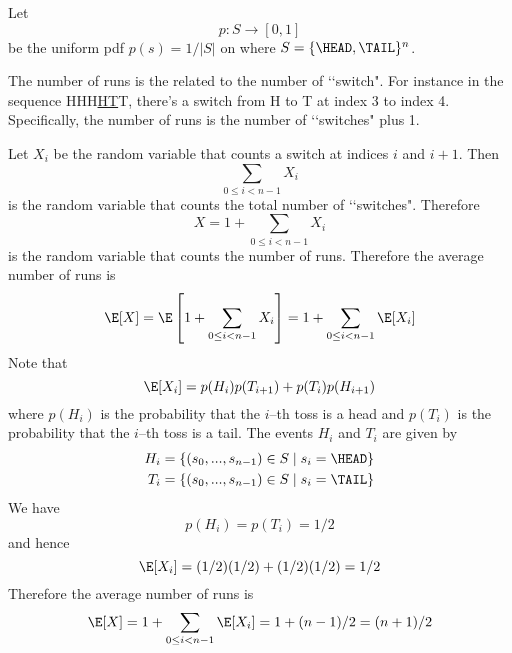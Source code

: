
Let
\[
  p : S \rightarrow [0,1]
\]
be the uniform pdf $p(s) = 1/|S|$ on
where $S = \{ \HEAD, \TAIL \}^n$.

The number of runs is the related to the number of \lq\lq switch".
For instance in the sequence HHH\underline{HT}T, there's a switch
from H to T at index 3 to index 4.
Specifically, the number of runs is the number of \lq\lq switches" plus 1.

Let $X_i$ be the random variable that counts a switch at indices $i$ and $i + 1$.
Then
\[
  \sum_{0 \leq i < n - 1} X_i
\]
is the random variable that counts the total number of \lq\lq switches".
Therefore
\[
  X = 1 + \sum_{0 \leq i < n - 1} X_i
\]
is the random variable that counts the number of runs.
Therefore the average number of runs is
\[
  \E[X] = \E \left[ 1 + \sum_{0 \leq i < n - 1} X_i \right] = 1 + \sum_{0 \leq i < n - 1} \E[X_i]
\]
Note that
\[
\E[X_i] = p(H_i)p(T_{i+1}) + p(T_i)p(H_{i+1}) 
\]
where
$p(H_i)$ is the probability that the $i$--th toss is a head
and 
$p(T_i)$ is the probability that the $i$--th toss is a tail.
The events $H_i$ and $T_i$ are given by
\begin{align*}
  H_i &= \{(s_0, ..., s_{n-1}) \in S \mid s_i = \HEAD \} \\
  T_i &= \{(s_0, ..., s_{n-1}) \in S \mid s_i = \TAIL \} 
\end{align*}
We have
\[
  p(H_i) = p(T_i) = 1/2
\]
and hence
\[
  \E[X_i] = (1/2)(1/2) + (1/2)(1/2) = 1/2 
\]
Therefore the average number of runs is
\[
  \E[X] = 1 + \sum_{0 \leq i < n - 1} \E[X_i] = 1 + (n - 1)/2 = (n + 1)/2
\]
    
